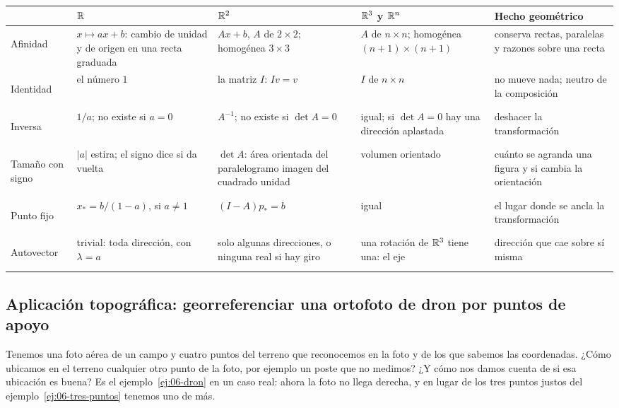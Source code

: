 {\small
\begin{tabularx}{\textwidth}{>{\bfseries\raggedright\arraybackslash}p{17mm}>{\raggedright\arraybackslash}p{30mm}>{\raggedright\arraybackslash}p{33mm}>{\raggedright\arraybackslash}p{30mm}Y}
\toprule
& \(\mathbb{R}\) & \(\mathbb{R}^2\) & \(\mathbb{R}^3\) y \(\mathbb{R}^n\) & Hecho geométrico\\
\midrule
Afinidad & \(x\mapsto ax+b\): cambio de unidad y de origen en una recta graduada &
\(Ax+b\), \(A\) de \(2\times2\); homogénea \(3\times3\) & \(A\) de \(n\times n\); homogénea
\((n+1)\times(n+1)\) & conserva rectas, paralelas y razones sobre una recta\\
\addlinespace
Identidad & el número \(1\) & la matriz \(I\): \(Iv=v\) & \(I\) de \(n\times n\) & no mueve
nada; neutro de la composición\\
\addlinespace
Inversa & \(1/a\); no existe si \(a=0\) & \(A^{-1}\); no existe si \(\det A=0\) & igual; si
\(\det A=0\) hay una dirección aplastada & deshacer la transformación\\
\addlinespace
Tamaño con signo & \(|a|\) estira; el signo dice si da vuelta & \(\det A\): área orientada
del paralelogramo imagen del cuadrado unidad & volumen orientado & cuánto se agranda una
figura y si cambia la orientación\\
\addlinespace
Punto fijo & \(x_\ast=b/(1-a)\), si \(a\neq1\) & \((I-A)p_\ast=b\) & igual & el lugar donde se
ancla la transformación\\
\addlinespace
Autovector & trivial: toda dirección, con \(\lambda=a\) & solo algunas direcciones, o
ninguna real si hay giro & una rotación de \(\mathbb{R}^3\) tiene una: el eje & dirección que cae
sobre sí misma\\
\bottomrule
\end{tabularx}
}

\subsection{Aplicación topográfica: georreferenciar una ortofoto de dron por puntos de apoyo}\label{sec:aplicacion-ortofoto}

Tenemos una foto aérea de un campo y cuatro puntos del terreno que reconocemos en la foto y de
los que sabemos las coordenadas. ¿Cómo ubicamos en el terreno cualquier otro punto de la foto,
por ejemplo un poste que no medimos? ¿Y cómo nos damos cuenta de si esa ubicación es buena? Es
el ejemplo~\ref{ej:06-dron} en un caso real: ahora la foto no llega derecha, y en lugar de los
tres puntos justos del ejemplo~\ref{ej:06-tres-puntos} tenemos uno de más.

